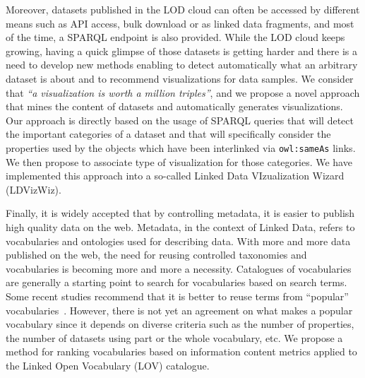 Moreover, datasets published in the LOD cloud can often be accessed by different means such as API access, bulk download or as linked data fragments, and most of the time, a SPARQL endpoint is also provided. While the LOD cloud keeps growing, having a quick glimpse of those datasets is getting harder and there is a need to develop new methods enabling to detect automatically what an arbitrary dataset is about and to recommend visualizations for data samples. We consider that \textit{``a visualization is worth a million triples''}, and  we propose a novel approach that mines the content of datasets and automatically generates visualizations. Our approach is directly based on the usage of SPARQL queries that will detect the important categories of a dataset and that will specifically consider the properties used by the objects which have been interlinked via \texttt{owl:sameAs} links. We then propose to associate type of visualization for those categories. We have implemented this approach into a so-called Linked Data VIzualization Wizard (LDVizWiz).

Finally, it is widely accepted that by controlling metadata, it is easier to publish high quality data on the web. Metadata, in the context of Linked Data, refers to vocabularies and ontologies used for describing data. With more and more data published on the web, the need for reusing controlled taxonomies and vocabularies is becoming more and more a necessity. Catalogues of vocabularies are generally a starting point to search for vocabularies based on search terms. Some recent studies recommend that it is better to reuse terms from ``popular'' vocabularies~\cite{krzysztof14}. However, there is not yet an agreement on what makes a popular vocabulary since it depends on diverse criteria such as the number of properties, the number of datasets using part or the whole vocabulary, etc. We propose a method for ranking vocabularies based on information content metrics applied to the Linked Open Vocabulary (LOV) catalogue.